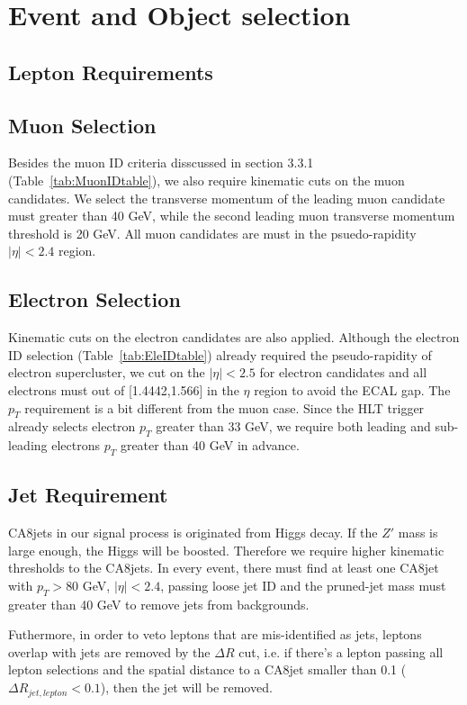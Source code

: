 \newpage
\section{Event and Object selection}


\subsection{Lepton Requirements}

\subsection*{Muon Selection}

Besides the muon ID criteria disscussed in section 3.3.1 (Table~\ref{tab:MuonIDtable}), we also require kinematic cuts on the muon candidates. We select the transverse momentum of the leading muon candidate must greater than 40 GeV, while the second leading muon transverse momentum threshold is 20 GeV. All muon candidates are must in the psuedo-rapidity $|\eta| < 2.4$ region.

\subsection*{Electron Selection}
Kinematic cuts on the electron candidates are also applied. Although the electron ID selection (Table~\ref{tab:EleIDtable}) already required the pseudo-rapidity of electron supercluster, we cut on the $|\eta| < 2.5$ for electron candidates and all electrons must out of [1.4442,1.566] in the $\eta$ region to avoid the ECAL gap. The $p_{T}$ requirement is a bit different from the muon case. Since the HLT trigger already selects electron $p_{T}$ greater than 33 GeV, we require both leading and sub-leading electrons $p_{T}$ greater than 40 GeV in advance.

\subsection{Jet Requirement}
CA8jets in our signal process is originated from Higgs decay. If the $Z'$ mass is large enough, the Higgs will be boosted. Therefore we require higher kinematic thresholds to the CA8jets. In every event, there must find at least one CA8jet with $p_{T} > 80$ GeV, $|\eta| < 2.4$, passing loose jet ID and the pruned-jet mass must greater than 40 GeV to remove jets from backgrounds.

Futhermore, in order to veto leptons that are mis-identified as jets, leptons overlap with jets are removed by the $\Delta R$ cut, i.e. if there's a lepton passing all lepton selections and the spatial distance to a CA8jet smaller than 0.1 ($\Delta R_{jet,lepton} < 0.1$), then the jet will be removed.

